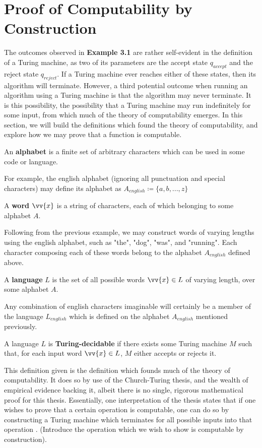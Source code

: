 \documentclass{article}
\begin{document}
\section{Proof of Computability by Construction}
The outcomes observed in \textbf{Example 3.1} are rather self-evident in the definition of a Turing machine, as two of its parameters are the accept state $q_{accept}$ and the reject state $q_{reject}$.  If a Turing machine ever reaches either of these states, then its algorithm will terminate.  However, a third potential outcome when running an algorithm using a Turing machine is that the algorithm may never terminate.  It is this possibility, the possibility that a Turing machine may run indefinitely for some input, from which much of the theory of computability emerges.  In this section, we will build the definitions which found the theory of computability, and explore how we may prove that a function is computable.
\begin{defin}
	An \textbf{alphabet} is a finite set of arbitrary characters which can be used in some code or language.
\end{defin}
\noindent For example, the english alphabet (ignoring all punctuation and special characters) may define its alphabet as $A_{english} \coloneq \{ a, b, ... , z \}$
\begin{defin}
	A \textbf{word} $\vv{x}$ is a string of characters, each of which belonging to some alphabet $A$.
\end{defin}
\noindent Following from the previous example, we may construct words of varying lengths using the english alphabet, such as "the", "dog", "was", and "running".  Each character composing each of these words belong to the alphabet $A_{english}$ defined above.
\begin{defin}
	A \textbf{language} $L$ is the set of all possible words $\vv{x} \in L$ of varying length, over some alphabet $A$.
\end{defin}
\noindent Any combination of english characters imaginable will certainly be a member of the language $L_{english}$ which is defined on the alphabet $A_{english}$ mentioned previously.
\begin{defin}
	A language $L$ is \textbf{Turing-decidable} if there exists some Turing machine $M$ such that, for each input word $\vv{x} \in L$, $M$ either accepts or rejects it. \cite{2}
\end{defin}
\noindent This definition given is the definition which founds much of the theory of computability.  It does so by use of the Church-Turing thesis, and the wealth of empirical evidence backing it, albeit there is no single, rigorous mathematical proof for this thesis.  Essentially, one interpretation of the thesis states that if one wishes to prove that a certain operation is computable, one can do so by constructing a Turing machine which terminates for all possible inputs into that operation \cite{4}.  (Introduce the operation which we wish to show is computable by construction).
\end{document}
